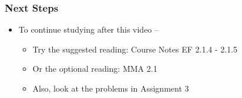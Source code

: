 \documentclass[10pt,english,aspectratio=169]{beamer}
\begin{document}
\begin{frame} \frametitle{Next Steps}

\begin{itemize}
\setlength\itemsep{5mm}
\item To continue studying after this video -- \vspace{2mm}

\begin{itemize}
 \setlength\itemsep{3mm}
 \item Try the suggested reading: Course Notes EF 2.1.4 - 2.1.5
 \item Or the optional reading: MMA 2.1
 \item Also, look at the problems in Assignment 3
\end{itemize}
\end{itemize}


\end{frame}
\end{document}
